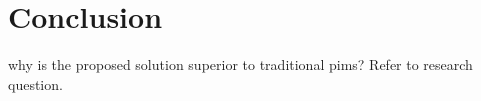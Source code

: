 \section{Conclusion}

why is the proposed solution superior to traditional \gls{pims}? Refer to
research question.
